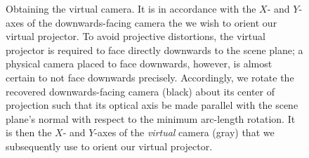 \documentclass[review]{elsarticle}
\begin{document}
\begin{figure}
    \centering
    \qquad
    \caption{Obtaining the virtual camera. It is in accordance with the $X$- and $Y$-axes of the downwards-facing camera the we wish to orient our virtual projector. To avoid projective distortions, the virtual projector is required to face directly downwards to the scene plane; a physical camera placed to face downwards, however, is almost certain to not face downwards 	precisely. Accordingly, we rotate the recovered downwards-facing camera (black) about its center of projection such that its optical axis be made parallel with the scene plane's normal with respect to the minimum arc-length rotation. It is then the $X$- and $Y$-axes of the \textit{virtual} camera (gray) that we subsequently use to orient our virtual projector.} %
    \label{fig:virtualcam}
\end{figure} 
\end{document}
